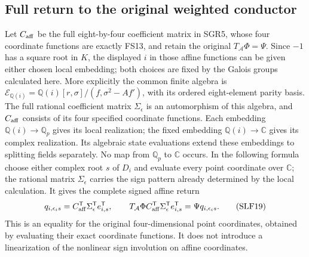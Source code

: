 \subsection{Full return to the original weighted conductor}
Let $C_{\rm aff}$ be the full eight-by-four coefficient matrix in
SGR5, whose four coordinate functions are exactly FS13, and retain
the original $T_{\mathcal A}\Phi=\Psi$. Since $-1$ has a square
root in $K$, the displayed $i$ in those affine functions can be
given either chosen local embedding; both choices are fixed by the
Galois groups calculated here. More explicitly the common finite
algebra is
$\mathscr E_{\mathbb Q(i)}=\mathbb Q(i)[r,\sigma]/(f,\sigma^2-Af')$,
with its ordered eight-element parity basis. The full rational
coefficient matrix $\Sigma_\epsilon$ is an automorphism of this
algebra, and $C_{\rm aff}$ consists of its four specified coordinate
functions. Each embedding $\mathbb Q(i)\to\mathbb Q_p$ gives its
local realization; the fixed embedding $\mathbb Q(i)\to\mathbb C$
gives its complex realization. Its algebraic state evaluations
extend these embeddings to splitting fields separately. No map
from $\mathbb Q_p$ to $\mathbb C$ occurs. In the following formula choose either complex root
$s$ of $D_i$ and evaluate every point coordinate over $\mathbb C$;
the rational matrix $\Sigma_\epsilon$ carries the sign pattern
already determined by the local calculation. It gives the complete
signed affine return
\[
 q_{i,\epsilon_i s}
   =C_{\rm aff}^{\mathsf T}\Sigma_\epsilon^{\mathsf T}e_{i,s}^{\mathsf T},
 \qquad
 T_{\mathcal A}\Phi C_{\rm aff}^{\mathsf T}
       \Sigma_\epsilon^{\mathsf T}e_{i,s}^{\mathsf T}
    =\Psi q_{i,\epsilon_i s}.                         \tag{SLF19}
\]
This is an equality for the original four-dimensional point
coordinates, obtained by evaluating their exact coordinate
functions. It does not introduce a linearization of the nonlinear
sign involution on affine coordinates.

